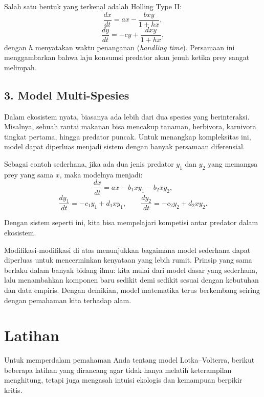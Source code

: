 \documentclass{bukumjh}
\begin{document}
Salah satu bentuk yang terkenal adalah {\jsg Holling Type II}:
\[
\frac{dx}{dt} = ax - \frac{bxy}{1 + h x},
\]
\[
\frac{dy}{dt} = -cy + \frac{dxy}{1 + h x},
\]
dengan $h$ menyatakan waktu penanganan (\textit{handling time}). Persamaan ini menggambarkan bahwa laju konsumsi predator akan jenuh ketika prey sangat melimpah.

\subsection*{3. Model Multi-Spesies}

Dalam ekosistem nyata, biasanya ada lebih dari dua spesies yang berinteraksi. Misalnya, sebuah rantai makanan bisa mencakup tanaman, herbivora, karnivora tingkat pertama, hingga predator puncak. Untuk menangkap kompleksitas ini, model dapat diperluas menjadi sistem dengan banyak persamaan diferensial.

Sebagai contoh sederhana, jika ada dua jenis predator $y_1$ dan $y_2$ yang memangsa prey yang sama $x$, maka modelnya menjadi:
\[
\frac{dx}{dt} = ax - b_1 x y_1 - b_2 x y_2,
\]
\[
\frac{dy_1}{dt} = -c_1 y_1 + d_1 x y_1, \qquad
\frac{dy_2}{dt} = -c_2 y_2 + d_2 x y_2.
\]

Dengan sistem seperti ini, kita bisa mempelajari kompetisi antar predator dalam ekosistem.

\medskip

\noindent
Modifikasi-modifikasi di atas menunjukkan bagaimana model sederhana dapat diperluas untuk mencerminkan kenyataan yang lebih rumit. Prinsip yang sama berlaku dalam banyak bidang ilmu: kita mulai dari model dasar yang sederhana, lalu menambahkan komponen baru sedikit demi sedikit sesuai dengan kebutuhan dan data empiris. Dengan demikian, model matematika terus berkembang seiring dengan pemahaman kita terhadap alam.

\section{Latihan}

Untuk memperdalam pemahaman Anda tentang model Lotka–Volterra, berikut beberapa latihan yang dirancang agar tidak hanya melatih keterampilan menghitung, tetapi juga mengasah intuisi ekologis dan kemampuan berpikir kritis.
\end{document}
